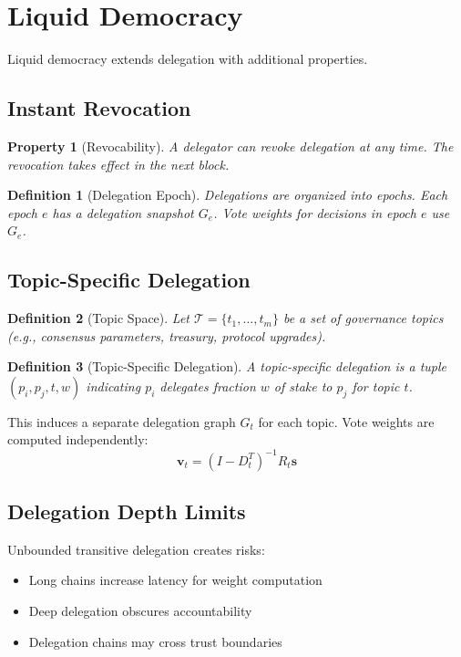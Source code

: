 \documentclass[11pt,a4paper]{article}
\newtheorem{definition}{Definition}
\newtheorem{property}{Property}
\begin{document}
\section{Liquid Democracy}

Liquid democracy extends delegation with additional properties.

\subsection{Instant Revocation}

\begin{property}[Revocability]
A delegator can revoke delegation at any time. The revocation takes effect in the next block.
\end{property}

\begin{definition}[Delegation Epoch]
Delegations are organized into epochs. Each epoch $e$ has a delegation snapshot $G_e$. Vote weights for decisions in epoch $e$ use $G_e$.
\end{definition}

\subsection{Topic-Specific Delegation}

\begin{definition}[Topic Space]
Let $\mathcal{T} = \{t_1, \ldots, t_m\}$ be a set of governance topics (e.g., consensus parameters, treasury, protocol upgrades).
\end{definition}

\begin{definition}[Topic-Specific Delegation]
A topic-specific delegation is a tuple $(p_i, p_j, t, w)$ indicating $p_i$ delegates fraction $w$ of stake to $p_j$ for topic $t$.
\end{definition}

This induces a separate delegation graph $G_t$ for each topic. Vote weights are computed independently:
\[
\mathbf{v}_t = (I - D_t^T)^{-1} R_t \mathbf{s}
\]

\subsection{Delegation Depth Limits}

Unbounded transitive delegation creates risks:
\begin{itemize}
    \item Long chains increase latency for weight computation
    \item Deep delegation obscures accountability
    \item Delegation chains may cross trust boundaries
\end{itemize}
\end{document}
